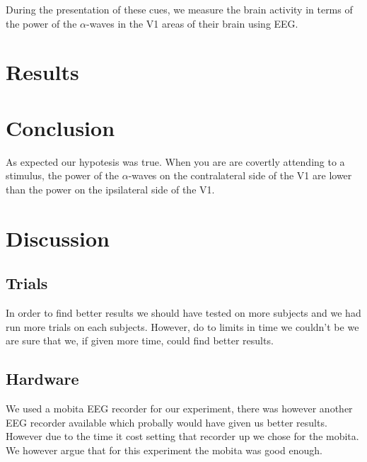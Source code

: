 \documentclass{article}
\begin{document}
During the presentation of these cues, we measure the brain activity in terms
of the power of the $\alpha$-waves in the V1 areas of their brain using EEG.

\section{Results}

\section{Conclusion}
As expected our hypotesis was true. When you are are covertly attending to a
stimulus, the power of the $\alpha$-waves on the contralateral side of the V1
are lower than the power on the ipsilateral side of the V1.

\section{Discussion}
\subsection{Trials}
In order to find better results we should have tested on more subjects and we
had run more trials on each subjects. However, do to limits in time we couldn't
be we are sure that we, if given more time, could find better results.
\subsection{Hardware}
We used a mobita EEG recorder for our experiment, there was however another EEG
recorder available which probally would have given us better results. However
due to the time it cost setting that recorder up we chose for the mobita. We
however argue that for this experiment the mobita was good enough.



\end{document}
